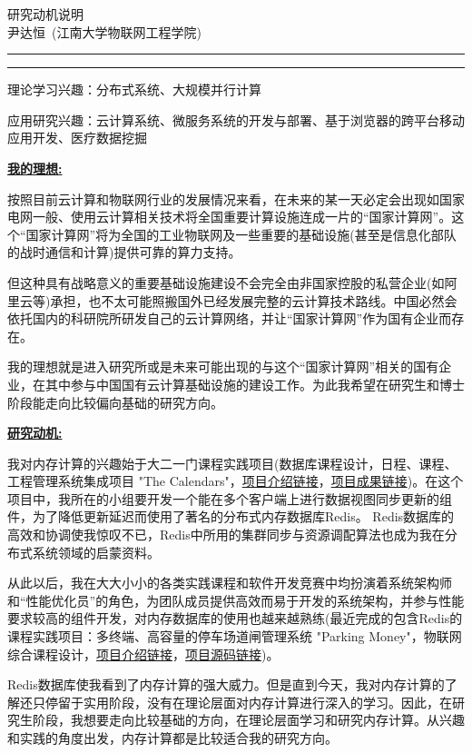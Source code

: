 \documentclass[a4paper]{ctexart}
\newcommand{\soptitle}{研究动机说明}
\newcommand{\yourname}{尹达恒}
\newcommand{\statement}[1]{\par\medskip
  \underline{\textbf{#1:}}\space
}
\begin{document}
\begin{center}\LARGE\soptitle\\
	\large\yourname\ (江南大学物联网工程学院)
\end{center}

\hrule
\vspace{1pt}
\hrule height 1pt

\bigskip

\renewcommand{\baselinestretch}{1.3}
理论学习兴趣：分布式系统、大规模并行计算

应用研究兴趣：云计算系统、微服务系统的开发与部署、基于浏览器的跨平台移动应用开发、医疗数据挖掘

\statement{我的理想}
按照目前云计算和物联网行业的发展情况来看，在未来的某一天必定会出现如国家电网一般、使用云计算相关技术将全国重要计算设施连成一片的“国家计算网”。这个“国家计算网”将为全国的工业物联网及一些重要的基础设施(甚至是信息化部队的战时通信和计算)提供可靠的算力支持。

但这种具有战略意义的重要基础设施建设不会完全由非国家控股的私营企业(如阿里云等)承担，也不太可能照搬国外已经发展完整的云计算技术路线。中国必然会依托国内的科研院所研发自己的云计算网络，并让“国家计算网”作为国有企业而存在。

我的理想就是进入研究所或是未来可能出现的与这个“国家计算网”相关的国有企业，在其中参与中国国有云计算基础设施的建设工作。为此我希望在研究生和博士阶段能走向比较偏向基础的研究方向。

\statement{研究动机}
我对内存计算的兴趣始于大二一门课程实践项目(数据库课程设计，日程、课程、工程管理系统集成项目 "The Calendars"，\href{http://yindaheng98.top:8888/details/Calendars/TheCalendars.pdf}{项目介绍链接}，\href{http://yindaheng98.top:8888/Calendars/login.html}{项目成果链接})。在这个项目中，我所在的小组要开发一个能在多个客户端上进行数据视图同步更新的组件，为了降低更新延迟而使用了著名的分布式内存数据库Redis。
Redis数据库的高效和协调使我惊叹不已，Redis中所用的集群同步与资源调配算法也成为我在分布式系统领域的启蒙资料。

从此以后，我在大大小小的各类实践课程和软件开发竞赛中均扮演着系统架构师和“性能优化员”的角色，为团队成员提供高效而易于开发的系统架构，并参与性能要求较高的组件开发，对内存数据库的使用也越来越熟练(最近完成的包含Redis的课程实践项目：多终端、高容量的停车场道闸管理系统 "Parking Money"，物联网综合课程设计，\href{http://yindaheng98.top:8888/details/ParkingMoney/ppt.pdf}{项目介绍链接}，\href{https://github.com/yindaheng98/ParkingMoney}{项目源码链接})。

Redis数据库使我看到了内存计算的强大威力。但是直到今天，我对内存计算的了解还只停留于实用阶段，没有在理论层面对内存计算进行深入的学习。因此，在研究生阶段，我想要走向比较基础的方向，在理论层面学习和研究内存计算。从兴趣和实践的角度出发，内存计算都是比较适合我的研究方向。

\pagestyle{empty}
\thispagestyle{empty}
\end{document}
